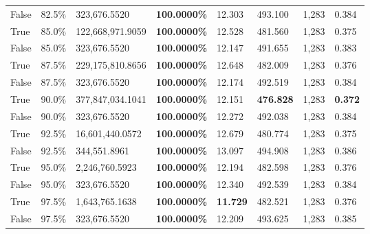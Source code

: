 \begin{table}[H]
\begin{tabular}{lllrllll}
\cline{1-8}
False & 82.5\% & 323,676.5520 & \bfseries \color{red} 100.0000\% & 12.303 & 493.100 & 1,283 & 0.384 \\
\cline{1-8}
True & 85.0\% & 122,668,971.9059 & \bfseries \color{red} 100.0000\% & 12.528 & 481.560 & 1,283 & 0.375 \\
\cline{1-8}
False & 85.0\% & 323,676.5520 & \bfseries \color{red} 100.0000\% & 12.147 & 491.655 & 1,283 & 0.383 \\
\cline{1-8}
True & 87.5\% & 229,175,810.8656 & \bfseries \color{red} 100.0000\% & 12.648 & 482.009 & 1,283 & 0.376 \\
\cline{1-8}
False & 87.5\% & 323,676.5520 & \bfseries \color{red} 100.0000\% & 12.174 & 492.519 & 1,283 & 0.384 \\
\cline{1-8}
True & 90.0\% & 377,847,034.1041 & \bfseries \color{red} 100.0000\% & 12.151 & \bfseries \color{red} 476.828 & 1,283 & \bfseries \color{red} 0.372 \\
\cline{1-8}
False & 90.0\% & 323,676.5520 & \bfseries \color{red} 100.0000\% & 12.272 & 492.038 & 1,283 & 0.384 \\
\cline{1-8}
True & 92.5\% & 16,601,440.0572 & \bfseries \color{red} 100.0000\% & 12.679 & 480.774 & 1,283 & 0.375 \\
\cline{1-8}
False & 92.5\% & 344,551.8961 & \bfseries \color{red} 100.0000\% & 13.097 & 494.908 & 1,283 & 0.386 \\
\cline{1-8}
True & 95.0\% & 2,246,760.5923 & \bfseries \color{red} 100.0000\% & 12.194 & 482.598 & 1,283 & 0.376 \\
\cline{1-8}
False & 95.0\% & 323,676.5520 & \bfseries \color{red} 100.0000\% & 12.340 & 492.539 & 1,283 & 0.384 \\
\cline{1-8}
True & 97.5\% & 1,643,765.1638 & \bfseries \color{red} 100.0000\% & \bfseries \color{red} 11.729 & 482.521 & 1,283 & 0.376 \\
\cline{1-8}
False & 97.5\% & 323,676.5520 & \bfseries \color{red} 100.0000\% & 12.209 & 493.625 & 1,283 & 0.385 \\
\cline{1-8}
\bottomrule
\end{tabular}
\end{table}
